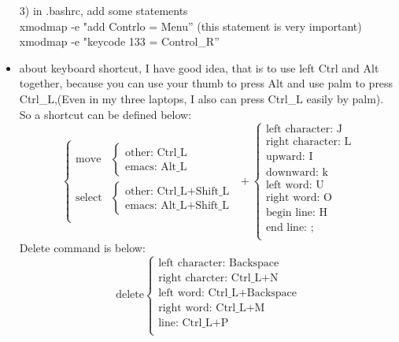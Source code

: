 \documentclass[a4paper,12pt,twoside]{book}
\begin{document}
\begin{CJK*}{UTF8}{song}
\begin{itemize}
	3) in .bashrc, add some statements\\
	xmodmap -e "add Contrlo = Menu'' (this statement is very important)\\
	xmodmap -e "keycode 133 = Control\_R''\\
	\item  about keyboard shortcut, I have good idea, that is to use left Ctrl and Alt together, because you can use your thumb to press Alt and use palm to
	press Ctrl\_L,(Even in my three laptops, I also can press Ctrl\_L easily by palm).
	So a shortcut can be defined below:
	\[ \left\{ \begin{array}{cl}
	            \textrm{move} & \left\{ \begin{array}{c} \textrm{other: Ctrl\_L} \\ \textrm{emacs: Alt\_L} \end{array}  \right. \\
		    \textrm{select} & \left\{ \begin{array}{c} \textrm{other: Ctrl\_L+Shift\_L} \\ \textrm{emacs: Alt\_L+Shift\_L} \end{array}  \right. \\
	           \end{array} \right. + \left\{ \begin{array}{c}
						\textrm{left character: J} \\
						\textrm{right character: L}\\
						\textrm{upward: I}\\
						\textrm{downward: k}\\
						\textrm{left word: U}\\
						\textrm{right word: O} \\
						\textrm{begin line: H}\\
						\textrm{end line: ;}\\
						\end{array} \right.
	\]
	Delete command is below: \\
	\[ \textrm{delete} \left\{ \begin{array}{l}
	            \textrm{left character: Backspace}  \\
		    \textrm{right charcter: Ctrl\_L+N} \\
		     \textrm{left word: Ctrl\_L+Backspace}  \\
		    \textrm{right word: Ctrl\_L+M} \\
		     \textrm{line: Ctrl\_L+P}  \\
	           \end{array} \right.
	\]
	

\end{itemize}
\end{CJK*}
\end{document}
